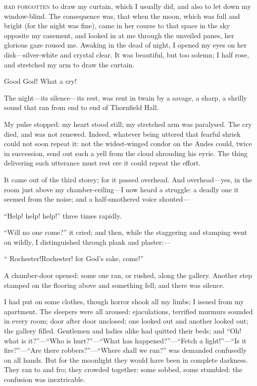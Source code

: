 
 \textsc{had forgotten} to draw my curtain, which I usually did, and also to let
down my window-blind. The consequence was, that when the moon, which
was full and bright (for the night was fine), came in her course to that
space in the sky opposite my casement, and looked in at me through the
unveiled panes, her glorious gaze roused me. Awaking in the dead of
night, I opened my eyes on her disk---silver-white and crystal clear. 
It was beautiful, but too solemn; I half rose, and stretched my arm to
draw the curtain.

Good God! What a cry!

The night---its silence---its rest, was rent in twain by a savage, a
sharp, a shrilly sound that ran from end to end of Thornfield Hall.

My pulse stopped: my heart stood still; my stretched arm was paralysed. 
The cry died, and was not renewed. Indeed, whatever being uttered that
fearful shriek could not soon repeat it: not the widest-winged condor on
the Andes could, twice in succession, send out such a yell from the
cloud shrouding his eyrie. The thing delivering such utterance must
rest ere it could repeat the effort.

It came out of the third storey; for it passed overhead. And
overhead---yes, in the room just above my chamber-ceiling---I now heard
a struggle: a deadly one it seemed from the noise; and a half-smothered
voice shouted---

\enquote{Help! help! help!} three times rapidly.

\enquote{Will no one come?} it cried; and then, while the staggering and
stamping went on wildly, I distinguished through plank and plaster:---

\enquote{ Rochester!Rochester! for God's sake, come!}

A chamber-door opened: some one ran, or rushed, along the gallery. 
Another step stamped on the flooring above and something fell; and there
was silence.

I had put on some clothes, though horror shook all my limbs; I issued
from my apartment. The sleepers were all aroused: ejaculations,
terrified murmurs sounded in every room; door after door unclosed; one
looked out and another looked out; the gallery filled. Gentlemen and
ladies alike had quitted their beds; and \enquote{Oh! what is
it?}---\enquote{Who is hurt?}---\enquote{What has
happened?}---\enquote{Fetch a light!}---\enquote{Is it
fire?}---\enquote{Are there robbers?}---\enquote{Where shall we run?}
was demanded confusedly on all hands. But for the moonlight they would
have been in complete darkness. They ran to and fro; they crowded
together: some sobbed, some stumbled: the confusion was inextricable.

